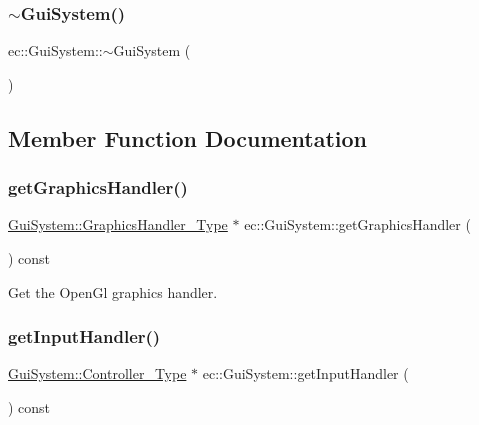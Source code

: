 \mbox{\label{classec_1_1_gui_system_a72535435539b29e6d00b96f1f490a725}} 
\subsubsection{\texorpdfstring{$\sim$\+Gui\+System()}{~GuiSystem()}}
{\footnotesize\ttfamily ec\+::\+Gui\+System\+::$\sim$\+Gui\+System (\begin{DoxyParamCaption}{ }\end{DoxyParamCaption})\hspace{0.3cm}{\ttfamily [default]}}



\subsection{Member Function Documentation}
\mbox{\label{classec_1_1_gui_system_affce2c93ce9689137662705d50405922}} 
\subsubsection{\texorpdfstring{get\+Graphics\+Handler()}{getGraphicsHandler()}}
{\footnotesize\ttfamily \mbox{\hyperlink{classec_1_1_gui_system_ace2e875c44326f620358ce6b1dfc3bc7}{Gui\+System\+::\+Graphics\+Handler\+\_\+\+Type}} $\ast$ ec\+::\+Gui\+System\+::get\+Graphics\+Handler (\begin{DoxyParamCaption}{ }\end{DoxyParamCaption}) const}

Get the Open\+Gl graphics handler. \mbox{\label{classec_1_1_gui_system_a0b8a9b486284a25044a8783d3c9f8744}} 
\subsubsection{\texorpdfstring{get\+Input\+Handler()}{getInputHandler()}}
{\footnotesize\ttfamily \mbox{\hyperlink{classec_1_1_gui_system_a06ff8d5daa43acea2e7ff43964bb14dd}{Gui\+System\+::\+Controller\+\_\+\+Type}} $\ast$ ec\+::\+Gui\+System\+::get\+Input\+Handler (\begin{DoxyParamCaption}{ }\end{DoxyParamCaption}) const}

